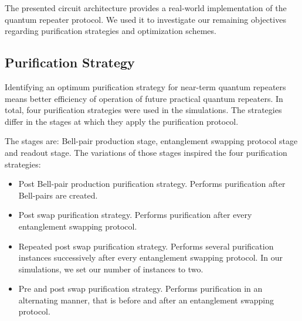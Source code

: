 \documentclass[11pt]{article}
\begin{document}
The presented circuit architecture provides a real-world implementation of the quantum repeater protocol. We used it to investigate our remaining objectives regarding purification strategies and optimization schemes.

\subsection{Purification Strategy}
Identifying an optimum purification strategy for near-term quantum repeaters means better efficiency of operation of future practical quantum repeaters. In total, four purification strategies were used in the simulations. The strategies differ in the stages at which they apply the purification protocol.

The stages are: Bell-pair production stage, entanglement swapping protocol stage and readout stage. The variations of those stages inspired the four purification strategies:
\begin{itemize}
    \item Post Bell-pair production purification strategy. Performs purification after Bell-pairs are created.
    \item Post swap purification strategy. Performs purification after every entanglement swapping protocol.
    \item Repeated post swap purification strategy. Performs several purification instances successively after every entanglement swapping protocol. In our simulations, we set our number of instances to two.
    \item Pre and post swap purification strategy. Performs purification in an alternating manner, that is before and after an entanglement swapping protocol.
\end{itemize}
\end{document}
